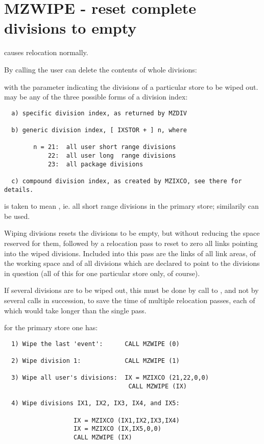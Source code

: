 \section{MZWIPE - reset complete divisions to empty}

 causes relocation normally.

By calling  the user can delete the contents of
whole divisions:


with the parameter  indicating the divisions
of a particular store to be wiped out.
 may be any of the three possible forms of a division index:

\begin{verbatim}
  a) specific division index, as returned by MZDIV

  b) generic division index, [ IXSTOR + ] n, where

        n = 21:  all user short range divisions
            22:  all user long  range divisions
            23:  all package divisions

  c) compound division index, as created by MZIXCO, see there for details.
\end{verbatim} 

  is taken to mean ,
ie. all short range divisions in the primary store;
similarily  can be used.

Wiping divisions resets the divisions to be empty,
but without reducing the space reserved for them,
followed by a relocation pass to reset to zero all links
pointing into the wiped divisions.
Included into this pass are the links of all link areas,
of the working space and of all divisions which are declared
to point to the divisions in question
(all of this for one particular store only, of course).

If several divisions are to be wiped out,
this must be done by  call to ,
and not by several calls in succession,
to save the time of multiple relocation passes,
each of which would take longer than the single pass.

\Examples

for the primary store one has:

\begin{verbatim}
  1) Wipe the last 'event':      CALL MZWIPE (0)

  2) Wipe division 1:            CALL MZWIPE (1)

  3) Wipe all user's divisions:  IX = MZIXCO (21,22,0,0)
                                  CALL MZWIPE (IX)

  4) Wipe divisions IX1, IX2, IX3, IX4, and IX5:

                   IX = MZIXCO (IX1,IX2,IX3,IX4)
                   IX = MZIXCO (IX,IX5,0,0)
                   CALL MZWIPE (IX)
\end{verbatim} 

